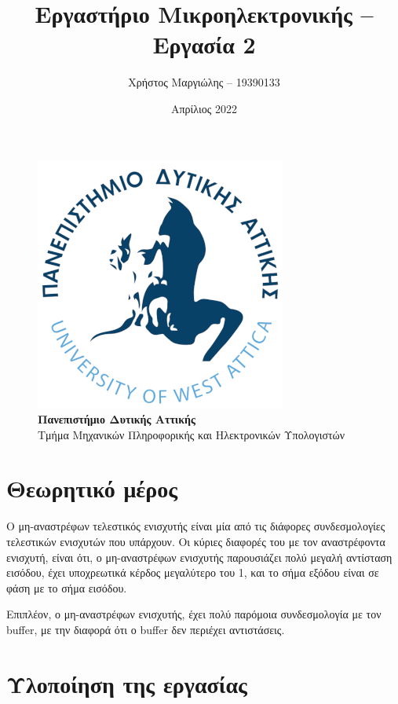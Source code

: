 \documentclass[12pt]{article}
\title{Εργαστήριο Μικροηλεκτρονικής -- Εργασία 2}
\author{Χρήστος Μαργιώλης -- 19390133}
\date{Απρίλιος 2022}
\begin{document}
\begin{titlepage}
        \maketitle
        \begin{figure}[t!]
        \begin{center}
        \includegraphics[scale=0.3]{./res/uniwalogo.png} \\
        \Large
        \textbf{Πανεπιστήμιο Δυτικής Αττικής} \\
        \large
        Τμήμα Μηχανικών Πληροφορικής και Ηλεκτρονικών Υπολογιστών
        \end{center}
        \end{figure}
\end{titlepage}

\renewcommand{\contentsname}{Περιεχόμενα}
\tableofcontents
\pagebreak

\section{Θεωρητικό μέρος}

Ο μη-αναστρέφων τελεστικός ενισχυτής είναι μία από τις διάφορες συνδεσμολογίες
τελεστικών ενισχυτών που υπάρχουν. Οι κύριες διαφορές του με τον αναστρέφοντα
ενισχυτή, είναι ότι, ο μη-αναστρέφων ενισχυτής παρουσιάζει πολύ μεγαλή
αντίσταση εισόδου, έχει υποχρεωτικά κέρδος μεγαλύτερο του 1, και το σήμα εξόδου
είναι σε φάση με το σήμα εισόδου.

Επιπλέον, ο μη-αναστρέφων ενισχυτής, έχει πολύ παρόμοια συνδεσμολογία με τον
buffer, με την διαφορά ότι ο buffer δεν περιέχει αντιστάσεις.

\section{Υλοποίηση της εργασίας}
\end{document}
